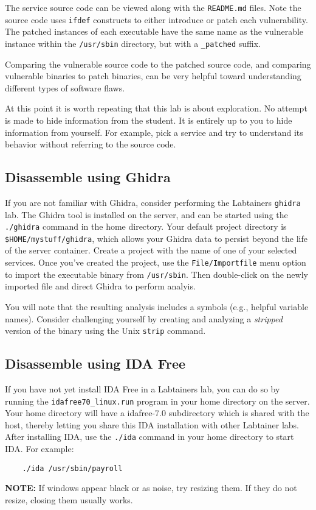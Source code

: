 {The service source code can be viewed along with the {\tt README.md} files.  Note the source code
uses {\tt ifdef} constructs to either introduce or patch each vulnerability.  The patched instances
of each executable have the same name as the vulnerable instance within the {\tt /usr/sbin} directory, 
but with a {\tt \_patched} suffix.

Comparing the vulnerable source code to the patched source code, and comparing vulnerable binaries
to patch binaries, can be very helpful toward understanding different types of software flaws.

At this point it is worth repeating that this lab is about exploration.  No attempt is made to hide
information from the student.  It is entirely up to you to hide information from yourself.  
For example, pick a service
and try to understand its behavior without referring to the source code. 


\subsection{Disassemble using Ghidra}
If you are not familiar with Ghidra, consider performing the Labtainers {\tt ghidra} lab.
The Ghidra tool is installed on the server, and can be started using the {\tt ./ghidra} command
in the home directory.  Your default project directory is {\tt \$HOME/mystuff/ghidra}, which allows your
Ghidra data to persist beyond the life of the server container.  Create a project with the name of
one of your selected services.  Once you've created the project, use the {\tt File/Importfile} menu
option to import the executable binary from {\tt /usr/sbin}.  Then double-click on the newly imported
file and direct Ghidra to perform analyis.

You will note that the resulting analysis includes a symbols (e.g., helpful variable names).  Consider
challenging yourself by creating and analyzing a \textit{stripped} version of the binary using the
Unix {\tt strip} command.

\subsection{Disassemble using IDA Free}
If you have not yet install IDA Free in a Labtainers lab, you can do so by running the 
{\tt idafree70\_linux.run} program in your home directory on the server.  Your home directory
will have a idafree-7.0 subdirectory which is shared with the host, thereby letting you share
this IDA installation with other Labtainer labs.  After installing IDA, use the {\tt ./ida} command
in your home directory to start IDA.  For example:
\begin{verbatim}
    ./ida /usr/sbin/payroll
\end{verbatim}
\noindent \textbf{NOTE:} If windows appear black or as noise, try resizing them.  If they do not resize, closing
them usually works.

}
